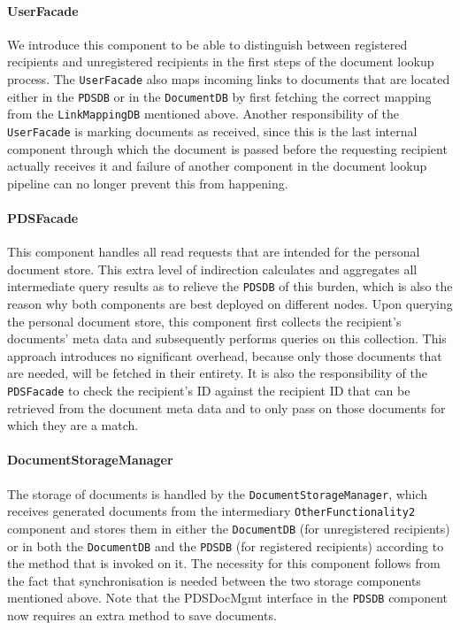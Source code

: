\documentclass[a4paper,10pt]{article}
\begin{document}
\paragraph{UserFacade}
We introduce this component to be able to distinguish between registered recipients and unregistered recipients in the first steps of the document lookup process. The \texttt{UserFacade} also maps incoming links to documents that are located either in the \texttt{PDSDB} or in the \texttt{DocumentDB} by first fetching the correct mapping from the \texttt{LinkMappingDB} mentioned above. Another responsibility of the \texttt{UserFacade} is marking documents as received, since this is the last internal component through which the document is passed before the requesting recipient actually receives it and failure of another component in the document lookup pipeline can no longer prevent this from happening.

\paragraph{PDSFacade}
This component handles all read requests that are intended for the personal document store. This extra level of indirection calculates and aggregates all intermediate query results as to relieve the \texttt{PDSDB} of this burden, which is also the reason why both components are best deployed on different nodes. Upon querying the personal document store, this component first collects the recipient's documents' meta data and subsequently performs queries on this collection. This approach introduces no significant overhead, because only those documents that are needed, will be fetched in their entirety. It is also the responsibility of the \texttt{PDSFacade} to check the recipient's ID against the recipient ID that can be retrieved from the document meta data and to only pass on those documents for which they are a match.

\paragraph{DocumentStorageManager}
The storage of documents is handled by the \texttt{DocumentStorageManager}, which receives generated documents from the intermediary \texttt{OtherFunctionality2} component and stores them in either the \texttt{DocumentDB} (for unregistered recipients) or in both the \texttt{DocumentDB} and the \texttt{PDSDB} (for registered recipients) according to the method that is invoked on it. The necessity for this component follows from the fact that synchronisation is needed between the two storage components mentioned above. Note that the PDSDocMgmt interface in the \texttt{PDSDB} component now requires an extra method to save documents.
\end{document}
